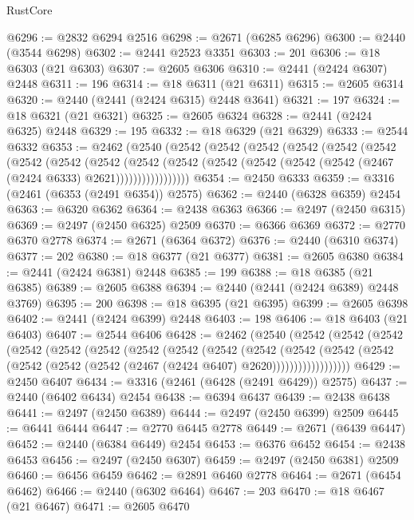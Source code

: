 \begin{lexlean}{RustCore}
\begin{coremodule}
@6296 := @2832 @6294 @2516
@6298 := @2671 (@6285 @6296)
@6300 := @2440 (@3544 @6298)
@6302 := @2441 @2523 @3351
@6303 := 201
@6306 := @18 @6303 (@21 @6303)
@6307 := @2605 @6306
@6310 := @2441 (@2424 @6307) @2448
@6311 := 196
@6314 := @18 @6311 (@21 @6311)
@6315 := @2605 @6314
@6320 := @2440 (@2441 (@2424 @6315) @2448 @3641)
@6321 := 197
@6324 := @18 @6321 (@21 @6321)
@6325 := @2605 @6324
@6328 := @2441 (@2424 @6325) @2448
@6329 := 195
@6332 := @18 @6329 (@21 @6329)
@6333 := @2544 @6332
@6353 := @2462
    (@2540
      (@2542
        (@2542
          (@2542
            (@2542
              (@2542
                (@2542
                  (@2542
                    (@2542
                      (@2542
                        (@2542
                          (@2542
                            (@2542 (@2542 (@2542 (@2542 (@2467 (@2424 @6333) @2621)))))))))))))))))
@6354 := @2450 @6333
@6359 := @3316 (@2461 (@6353 (@2491 @6354)) @2575)
@6362 := @2440 (@6328 @6359) @2454
@6363 := @6320 @6362
@6364 := @2438 @6363
@6366 := @2497 (@2450 @6315)
@6369 := @2497 (@2450 @6325) @2509
@6370 := @6366 @6369
@6372 := @2770 @6370 @2778
@6374 := @2671 (@6364 @6372)
@6376 := @2440 (@6310 @6374)
@6377 := 202
@6380 := @18 @6377 (@21 @6377)
@6381 := @2605 @6380
@6384 := @2441 (@2424 @6381) @2448
@6385 := 199
@6388 := @18 @6385 (@21 @6385)
@6389 := @2605 @6388
@6394 := @2440 (@2441 (@2424 @6389) @2448 @3769)
@6395 := 200
@6398 := @18 @6395 (@21 @6395)
@6399 := @2605 @6398
@6402 := @2441 (@2424 @6399) @2448
@6403 := 198
@6406 := @18 @6403 (@21 @6403)
@6407 := @2544 @6406
@6428 := @2462
    (@2540
      (@2542
        (@2542
          (@2542
            (@2542
              (@2542
                (@2542
                  (@2542
                    (@2542
                      (@2542
                        (@2542
                          (@2542
                            (@2542
                              (@2542
                                (@2542 (@2542 (@2542 (@2467 (@2424 @6407) @2620))))))))))))))))))
@6429 := @2450 @6407
@6434 := @3316 (@2461 (@6428 (@2491 @6429)) @2575)
@6437 := @2440 (@6402 @6434) @2454
@6438 := @6394 @6437
@6439 := @2438 @6438
@6441 := @2497 (@2450 @6389)
@6444 := @2497 (@2450 @6399) @2509
@6445 := @6441 @6444
@6447 := @2770 @6445 @2778
@6449 := @2671 (@6439 @6447)
@6452 := @2440 (@6384 @6449) @2454
@6453 := @6376 @6452
@6454 := @2438 @6453
@6456 := @2497 (@2450 @6307)
@6459 := @2497 (@2450 @6381) @2509
@6460 := @6456 @6459
@6462 := @2891 @6460 @2778
@6464 := @2671 (@6454 @6462)
@6466 := @2440 (@6302 @6464)
@6467 := 203
@6470 := @18 @6467 (@21 @6467)
@6471 := @2605 @6470

\end{coremodule}
\end{lexlean}
